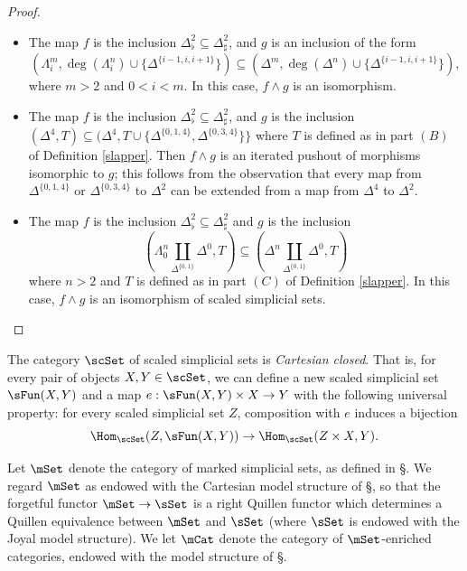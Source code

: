\begin{proof}
\begin{itemize}
\item[$(2A')$] The map $f$ is the inclusion $\Delta^2_{\flat} \subseteq \Delta^2_{\sharp}$, and
$g$ is an inclusion of the form $$( \Lambda^m_i, \deg( \Lambda^n_i) \cup \{ \Delta^{ \{i-1, i, i+1\}} \}
) \subseteq ( \Delta^m, \deg( \Delta^n) \cup \{ \Delta^{ \{i-1, i, i+1\}} \}),$$ where $m > 2$ and
$0 < i < m$. In this case, $f \wedge g$ is an isomorphism.

\item[$(2B)$] The map $f$ is the inclusion $\Delta^2_{\flat} \subseteq \Delta^2_{\sharp}$, and
$g$ is the inclusion
$(\Delta^4, T ) \subseteq (\Delta^4, T
\cup \{ \Delta^{ \{0,1,4 \} }, \Delta^{ \{0,3,4\} } \} \}$ where $T$ is defined as in part
$(B)$ of Definition \ref{slapper}. Then $f \wedge g$ is an iterated pushout of morphisms isomorphic to $g$; this follows from the observation that every map from $\Delta^{ \{0,1,4\} }$ or $\Delta^{ \{0,3,4\} }$ to $\Delta^2$ can be extended from a map from $\Delta^4$ to $\Delta^2$.

\item[$(2C)$] The map $f$ is the inclusion $\Delta^2_{\flat} \subseteq \Delta^2_{\sharp}$
and $g$ is the inclusion
$$ ( \Lambda^{n}_0 \coprod_{ \Delta^{ \{0,1\} }} \Delta^0, T)
\subseteq ( \Delta^n \coprod_{ \Delta^{ \{0,1\} } } \Delta^0, T)$$
where $n > 2$ and $T$ is defined as in part $(C)$ of Definition \ref{slapper}. In this case,
$f \wedge g$ is an isomorphism of scaled simplicial sets.
\end{itemize}
\end{proof}

\begin{notation}
The category $\scSet$ of scaled simplicial sets is {\it Cartesian closed}. That is, for
every pair of objects $X,Y \in \scSet$, we can define a new scaled simplicial set
$\sFun( X, Y)$ and a map $e: \sFun(X,Y) \times X \rightarrow Y$ with the following universal property: for every scaled simplicial set $Z$, composition with $e$ induces a bijection
$$ \Hom_{ \scSet}( Z, \sFun(X,Y) ) \rightarrow \Hom_{ \scSet}( Z \times X, Y ).$$
\end{notation}

Let $\mSet$ denote the category of marked simplicial sets, as defined in \S {}.
We regard $\mSet$ as endowed with the Cartesian model structure of \S {},
so that the forgetful functor $\mSet \rightarrow \sSet$ is a right Quillen functor which
determines a Quillen equivalence between $\mSet$ and $\sSet$ (where $\sSet$ is
endowed with the Joyal model structure). We let $\mCat$ denote the category
of $\mSet$-enriched categories, endowed with the model structure of \S {}.

